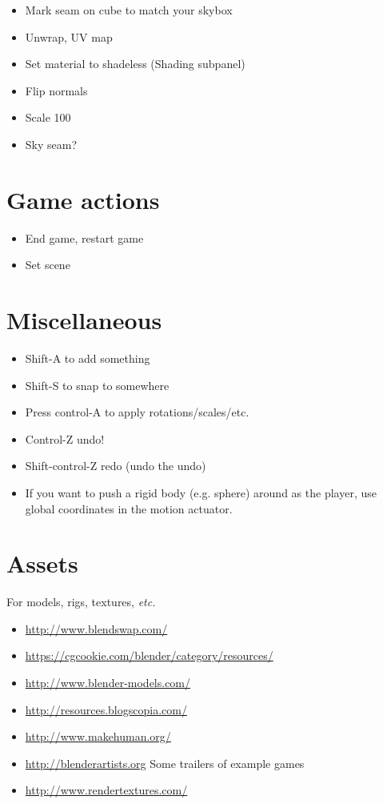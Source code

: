 \documentclass{article}
\newcommand{\bi}{\begin{itemize}}
\newcommand{\ii}{\item}
\newcommand{\ei}{\end{itemize}}
\begin{document}
\bi
\ii Mark seam on cube to match your skybox
\ii Unwrap, UV map
\ii Set material to shadeless (Shading subpanel)
\ii Flip normals
\ii Scale 100
\ii Sky seam?
\ei

\section{Game actions}
\bi
\ii End game, restart game
\ii Set scene
\ei

\section{Miscellaneous}

\bi
\ii Shift-A to add something
\ii Shift-S to snap to somewhere
\ii Press control-A to apply rotations/scales/etc.
\ii Control-Z undo!
\ii Shift-control-Z redo (undo the undo)
\ii If you want to push a rigid body (e.g. sphere) around as the player,
use global coordinates in the motion actuator. 
\ei

\section{Assets}
For models, rigs, textures, {\em etc.}
\bi
\ii\url{http://www.blendswap.com/}
\ii\url{https://cgcookie.com/blender/category/resources/}
\ii\url{http://www.blender-models.com/}
\ii\url{http://resources.blogscopia.com/}
\ii\url{http://www.makehuman.org/}
\ii\url{http://blenderartists.org} Some trailers of example games
\ii\url{http://www.rendertextures.com/}
\ei
\end{document}
